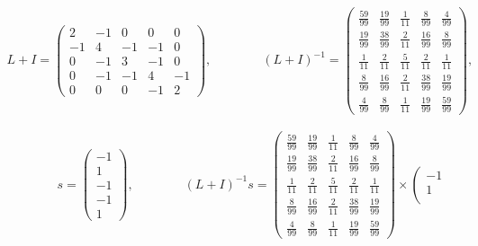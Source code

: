 \begin{equation}
	\begin{aligned}
		L+I=
		\left(\begin{matrix}
		2 & -1 & 0 & 0 & 0 \\
		-1 & 4 & -1 & -1 & 0 \\
		0 & -1 & 3 & -1 & 0 \\
		0 & -1 & -1 & 4 & -1 \\
		0 & 0 & 0 & -1 & 2
		\end{matrix}\right),
		\qquad \qquad 
		(L+I)^{-1}=
		\left(\begin{matrix}
		\frac{59}{99} & \frac{19}{99} & \frac{1}{11} & \frac{8}{99} & \frac{4}{99} \\
		\frac{19}{99} & \frac{38}{99} & \frac{2}{11} & \frac{16}{99} & \frac{8}{99} \\
		\frac{1}{11} & \frac{2}{11} & \frac{5}{11} & \frac{2}{11} & \frac{1}{11} \\
		\frac{8}{99} & \frac{16}{99} & \frac{2}{11} & \frac{38}{99} & \frac{19}{99} \\
		\frac{4}{99} & \frac{8}{99} & \frac{1}{11} & \frac{19}{99} & \frac{59}{99}
		\end{matrix}\right)
		,
		\\
		\\
		\\
		\qquad \qquad
		s=
		\left(\begin{matrix}
		-1 \\
		1 \\
		-1 \\
		-1 \\
		1
		\end{matrix}\right)
		,
		\qquad \qquad
		(L+I)^{-1}s=
		\left(\begin{matrix}
		\frac{59}{99} & \frac{19}{99} & \frac{1}{11} & \frac{8}{99} & \frac{4}{99} \\
		\frac{19}{99} & \frac{38}{99} & \frac{2}{11} & \frac{16}{99} & \frac{8}{99} \\
		\frac{1}{11} & \frac{2}{11} & \frac{5}{11} & \frac{2}{11} & \frac{1}{11} \\
		\frac{8}{99} & \frac{16}{99} & \frac{2}{11} & \frac{38}{99} & \frac{19}{99} \\
		\frac{4}{99} & \frac{8}{99} & \frac{1}{11} & \frac{19}{99} & \frac{59}{99}
		\end{matrix}\right)		\times
		\left(\begin{matrix}
		-1 \\
		1 \\

\end{matrix}
\end{aligned}
\end{equation}
